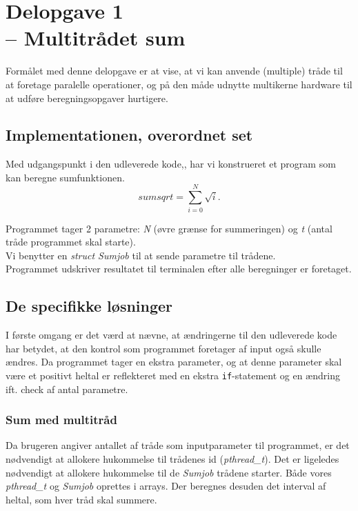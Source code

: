 \documentclass[main.tex]{subfile}
\begin{document}
\section{Delopgave 1\\\normalsize{-- Multitrådet sum}}
Formålet med denne delopgave er at vise, at vi kan anvende (multiple) tråde til at foretage paralelle operationer, og på den måde udnytte multikerne hardware til at udføre beregningsopgaver hurtigere.

\subsection{Implementationen, overordnet set}
Med udgangspunkt i den udleverede kode,\cite[s. 171]{SA:2013}, har vi konstrueret et program som kan beregne sumfunktionen.
\begin{equation*}
sumsqrt = \sum_{i=0}^N \sqrt{i}.
\end{equation*}

Programmet tager 2 parametre: \textit{N} (øvre grænse for summeringen) og \textit{t} (antal tråde programmet skal starte).\\

Vi benytter en \textit{struct Sumjob} til at sende parametre til trådene.\\

Programmet udskriver resultatet til terminalen efter alle beregninger er foretaget.

\subsection{De specifikke løsninger}
I første omgang er det værd at nævne, at ændringerne til den udleverede kode har betydet, at den kontrol som programmet foretager af input også skulle ændres. Da programmet tager en ekstra parameter, og at denne parameter skal være et positivt heltal er reflekteret med en ekstra \texttt{if}-statement og en ændring ift. check af antal parametre.

\subsubsection{Sum med multitråd}
Da brugeren angiver antallet af tråde som inputparameter til programmet, er det nødvendigt at allokere hukommelse til trådenes id (\textit{pthread\_t}). Det er ligeledes nødvendigt at allokere hukommelse til de \textit{Sumjob} trådene starter. Både vores \textit{pthread\_t} og \textit{Sumjob} oprettes i arrays. Der beregnes desuden det interval af heltal, som hver tråd skal summere.\\ 
\end{document}
